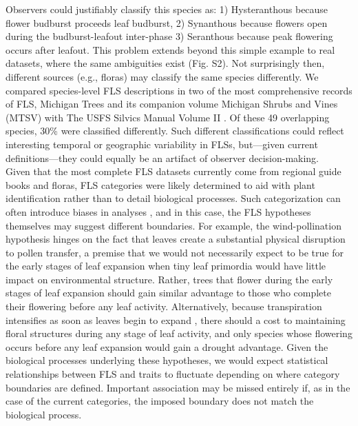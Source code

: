 \documentclass{article}
\begin{document}
{\noindent Observers could justifiably classify this species as: 1) Hysteranthous because flower budburst proceeds leaf budburst, 2) Synanthous because flowers open during the budburst-leafout inter-phase 3) Seranthous because peak flowering occurs after leafout. This problem extends beyond this simple example to real datasets, \citep[e.g.][]{OKeefe2015} where the same ambiguities exist (Fig. S2). Not surprisingly then, different sources (e.g., floras) may classify the same species differently. We compared species-level FLS descriptions in two of the most comprehensive records of FLS, Michigan Trees and its companion volume Michigan Shrubs and Vines (MTSV) \citep{Barnes2004,Barnes2016} with The USFS Silvics Manual Volume II \citep{Burns1990}. Of these 49 overlapping species, 30\% were classified differently. Such different classifications could reflect interesting temporal or geographic variability in FLSs, but---given current definitions---they could equally be an artifact of observer decision-making.\\

\noindent Given that the most complete FLS datasets currently come from regional guide books and floras, FLS categories were likely determined to aid with plant identification rather than to detail biological processes. Such categorization can often introduce biases in analyses \citep{}, and in this case, the FLS hypotheses themselves may suggest different boundaries. For example, the wind-pollination hypothesis hinges on the fact that leaves create a substantial physical disruption to pollen transfer, a premise that we would not necessarily expect to be true for the early stages of leaf expansion when tiny leaf primordia would have little impact on environmental structure. Rather, trees that flower during the early stages of leaf expansion should gain similar advantage to those who complete their flowering before any leaf activity. Alternatively, because transpiration intensifies as soon as leaves begin to expand \citep{Breda1996,Wang2018}, there should a cost to maintaining floral structures during any stage of leaf activity, and only species whose flowering occurs before any leaf expansion would gain a drought advantage. Given the biological processes underlying these hypotheses, we would expect statistical relationships between FLS and traits to fluctuate depending on where category boundaries are defined. Important association may be missed entirely if, as in the case of the current categories, the imposed boundary does not match the biological process.

}
\end{document}
